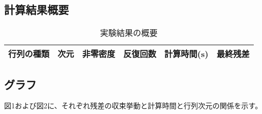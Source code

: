 \documentclass{article}
\begin{document}
\subsection{計算結果概要}
\begin{table}[htbp]
    \centering
    \caption{実験結果の概要}
    \label{tab:results_summary}
    \begin{tabular}{|c|c|c|c|c|c|}
        \hline
        行列の種類 & 次元 & 非零密度 & 反復回数 & 計算時間(s) & 最終残差 \\
        \hline
        \hline
    \end{tabular}
\end{table}

\subsection{グラフ}
図1および図2に、それぞれ残差の収束挙動と計算時間と行列次元の関係を示す。
% 


\end{document}
